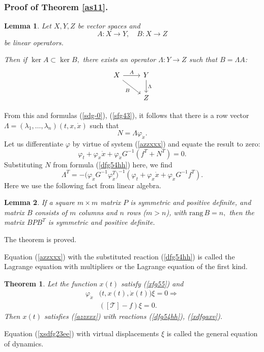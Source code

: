 \documentclass[reqno,12pt]{amsproc}
\newtheorem{theo}{Theorem}
\newtheorem{lem}{Lemma}
\newcommand\ph\varphi
\begin{document}
\subsubsection*{ Proof of Theorem \ref{as11}.} \begin{lem}\label{dfh6ll} Let $X,Y,Z$ be vector spaces and
$$A:X\to Y,\quad B:X\to Z$$ be linear operators.

Then if $\ker A\subset\ker B,$ there exists an operator $\Lambda:Y\to Z$ such that $B=\Lambda A$:
\[
  \begin{tikzcd}
    X \arrow{r}{A} \arrow[swap]{dr}{B} & Y \arrow{d}{\Lambda} \\
     & Z
  \end{tikzcd}
\]
\end{lem}
From this and formulas (\ref{sdg-0}), (\ref{sfg43}), it follows 
that there is a row vector $\Lambda=(\lambda_1,\ldots,\lambda_n)(t,x,\dot x)$ such that 
\begin{equation}\label{dfg54hh}N=\Lambda\ph_{\dot x}.\end{equation}
Let us differentiate $\ph$ by virtue of system (\ref{azzxxx}) and equate the result to zero:
$$\ph_t+\ph_x\dot x+\ph_{\dot x}G^{-1}(f^T+N^T)=0.$$
Substituting $N$ from formula (\ref{dfg54hh}) here, we find
\begin{equation}\label{xdfgaxv}\Lambda^T=-\big(\ph_{\dot x}G^{-1}\ph_{\dot x}^T\big)^{-1}(\ph_t+\ph_x\dot x+\ph_{\dot x}G^{-1}f^T).\end{equation}
Here we use the following fact from linear algebra.
\begin{lem}\label{xfg6zzzz6}If a square $m\times m$ matrix $P$ is symmetric and positive definite, and matrix $B$ consists of $m$ columns and $n$ rows ($m>n$), with $\mathrm{rang}\,B=n,$ then the matrix $BPB^T$ is symmetric and positive definite.\end{lem}
The theorem is proved.

Equation (\ref{azzxxx}) with the substituted reaction (\ref {dfg54hh}) is called the Lagrange equation with multipliers or the Lagrange equation of the first kind.

\begin{theo}\label{dfg44}
Let the function $x(t)$ satisfy (\ref {xfg55}) and 
\begin{align}\ph_{\dot x}&\big(t,x(t),\dot x(t)\big)\xi=0\Longrightarrow \nonumber\\
&([\mathscr T]-f)\xi=0.\label{xsdfg23ee}\end{align}
Then $x(t)$ satisfies (\ref{azzxxx}) with reactions (\ref{dfg54hh}), (\ref{xdfgaxv}).
\end{theo}Equation (\ref{xsdfg23ee}) with virtual displacements $\xi$ is called the general equation of dynamics.
\end{document}
